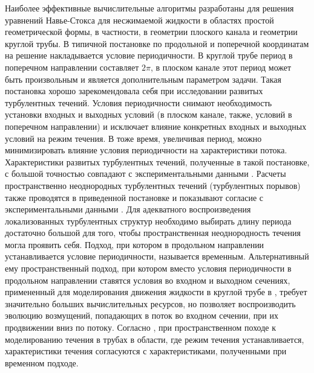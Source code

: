 Наиболее эффективные вычислительные алгоритмы разработаны для решения уравнений Навье-Стокса для несжимаемой жидкости в областях простой геометрической формы, в частности, в геометрии плоского канала и геометрии круглой трубы. В типичной постановке по продольной и поперечной координатам на решение накладывается условие периодичности. В круглой трубе период в поперечном направлении составляет $2\pi$, в плоском канале этот период может быть произвольным и является дополнительным параметром задачи. Такая постановка хорошо зарекомендовала себя при исследовании развитых турбулентных течений. Условия периодичности снимают необходимость установки входных и выходных условий (в плоском канале, также, условий в поперечном направлении) и исключает влияние конкретных входных и выходных условий на режим течения. В тоже время, увеличивая период, можно минимизировать влияние условия периодичности на характеристики потока. Характеристики развитых турбулентных течений, полученные в такой постановке, с большой точностью совпадают с экспериментальными данными \cite{Kim1987, Eggels1994, Nikitin1996}. Расчеты пространственно неоднородных турбулентных течений (турбулентных порывов) также проводятся в приведенной постановке и показывают согласие с экспериментальными данными \cite{Priymak2004, Avila2010, Song2017}. Для адекватного воспроизведения локализованных турбулентных структур необходимо выбирать длину периода достаточно большой для того, чтобы пространственная неоднородность течения могла проявить себя. Подход, при котором в продольном направлении устанавливается условие периодичности, называется временным. Альтернативный ему пространственный подход, при котором вместо условия периодичности в продольном направлении ставятся условия во входном и выходном сечениях, примененный для моделирования движения жидкости в круглой трубе в \cite{Nikitin1995}, требует значительно больших вычислительных ресурсов, но позволяет воспроизводить эволюцию возмущений, попадающих в поток во входном сечении, при их продвижении вниз по потоку. Согласно \cite{Nikitin1995}, при пространственном походе к моделированию течения в трубах в области, где режим течения устанавливается, характеристики течения согласуются с характеристиками, полученными при временном подходе. 

